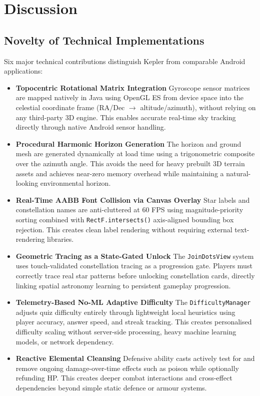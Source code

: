 \documentclass[conference]{IEEEtran}
\begin{document}
\section{Discussion}
\label{sec:discussion}

\subsection{Novelty of Technical Implementations}

Six major technical contributions distinguish Kepler from comparable Android applications:

\begin{itemize}

\item \textbf{Topocentric Rotational Matrix Integration}  
Gyroscope sensor matrices are mapped natively in Java using OpenGL ES from device space into the celestial coordinate frame (RA/Dec $\rightarrow$ altitude/azimuth), without relying on any third-party 3D engine. This enables accurate real-time sky tracking directly through native Android sensor handling.

\item \textbf{Procedural Harmonic Horizon Generation}  
The horizon and ground mesh are generated dynamically at load time using a trigonometric composite over the azimuth angle. This avoids the need for heavy prebuilt 3D terrain assets and achieves near-zero memory overhead while maintaining a natural-looking environmental horizon.

\item \textbf{Real-Time AABB Font Collision via Canvas Overlay}  
Star labels and constellation names are anti-cluttered at 60 FPS using magnitude-priority sorting combined with \texttt{RectF.intersects()} axis-aligned bounding box rejection. This creates clean label rendering without requiring external text-rendering libraries.

\item \textbf{Geometric Tracing as a State-Gated Unlock}  
The \texttt{JoinDotsView} system uses touch-validated constellation tracing as a progression gate. Players must correctly trace real star patterns before unlocking constellation cards, directly linking spatial astronomy learning to persistent gameplay progression.

\item \textbf{Telemetry-Based No-ML Adaptive Difficulty}  
The \texttt{DifficultyManager} adjusts quiz difficulty entirely through lightweight local heuristics using player accuracy, answer speed, and streak tracking. This creates personalised difficulty scaling without server-side processing, heavy machine learning models, or network dependency.

\item \textbf{Reactive Elemental Cleansing}  
Defensive ability casts actively test for and remove ongoing damage-over-time effects such as poison while optionally refunding HP. This creates deeper combat interactions and cross-effect dependencies beyond simple static defence or armour systems.

\end{itemize}
\end{document}
